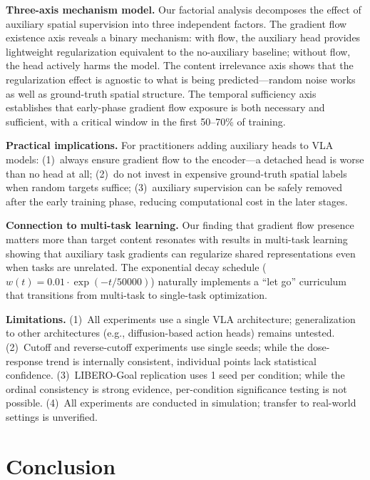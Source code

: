 \documentclass[10pt,twocolumn]{article}
\begin{document}
\textbf{Three-axis mechanism model.}\quad
Our factorial analysis decomposes the effect of auxiliary spatial supervision into three independent factors.
The gradient flow existence axis reveals a binary mechanism: with flow, the auxiliary head provides lightweight regularization equivalent to the no-auxiliary baseline; without flow, the head actively harms the model.
The content irrelevance axis shows that the regularization effect is agnostic to what is being predicted---random noise works as well as ground-truth spatial structure.
The temporal sufficiency axis establishes that early-phase gradient flow exposure is both necessary and sufficient, with a critical window in the first 50--70\% of training.

\textbf{Practical implications.}\quad
For practitioners adding auxiliary heads to VLA models:
(1)~always ensure gradient flow to the encoder---a detached head is worse than no head at all;
(2)~do not invest in expensive ground-truth spatial labels when random targets suffice;
(3)~auxiliary supervision can be safely removed after the early training phase, reducing computational cost in the later stages.

\textbf{Connection to multi-task learning.}\quad
Our finding that gradient flow presence matters more than target content resonates with results in multi-task learning showing that auxiliary task gradients can regularize shared representations even when tasks are unrelated.
The exponential decay schedule ($w(t) = 0.01 \cdot \exp(-t/50000)$) naturally implements a ``let go'' curriculum that transitions from multi-task to single-task optimization.

\textbf{Limitations.}\quad
(1)~All experiments use a single VLA architecture; generalization to other architectures (e.g., diffusion-based action heads) remains untested.
(2)~Cutoff and reverse-cutoff experiments use single seeds; while the dose-response trend is internally consistent, individual points lack statistical confidence.
(3)~LIBERO-Goal replication uses 1 seed per condition; while the ordinal consistency is strong evidence, per-condition significance testing is not possible.
(4)~All experiments are conducted in simulation; transfer to real-world settings is unverified.

\section{Conclusion}
\label{sec:conclusion}
\end{document}
